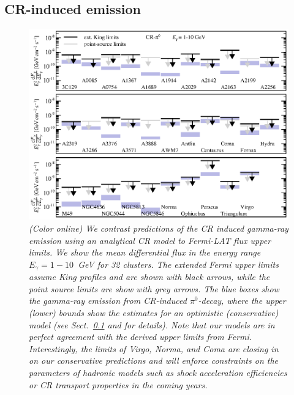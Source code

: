 \documentclass[10pt,aps,pra,reprint,amsmath,amsfonts,amssymb,showpacs,nofootinbib,floatfix]{revtex4-1}
\newcommand{\Fermi}{{\em Fermi}\xspace}
\begin{document}
\subsection{CR-induced emission}
\label{sec:CRemission}
\begin{figure}
\begin{minipage}{2.0\columnwidth}
  \includegraphics[width=0.99\columnwidth]{figures/Fermi.comp.CR.diff.eps}
  \caption{\it (Color online) We contrast predictions of the CR
    induced gamma-ray emission using an analytical CR model \protect
    \cite{2010MNRAS.409..449P} to \Fermi-LAT flux upper limits. We
    show the mean differential flux in the energy range
    $E_\gamma=1-10$~GeV for 32 clusters. The extended \Fermi upper
    limits assume King profiles and are shown with black arrows, while
    the point source limits are show with grey arrows. The blue boxes
    show the gamma-ray emission from CR-induced $\pi^0$-decay, where
    the upper (lower) bounds show the estimates for an optimistic
    (conservative) model (see Sect.~\ref{sec:CRemission} and
    \cite{2010MNRAS.409..449P} for details). Note that our models are
    in perfect agreement with the derived upper limits from
    \Fermi. Interestingly, the limits of Virgo, Norma, and Coma are
    closing in on our conservative predictions and will enforce
    constraints on the parameters of hadronic models such as shock
    acceleration efficiencies or CR transport properties in the coming
    years.}
 \label{fig15}
\end{minipage}
\end{figure}
\end{document}
